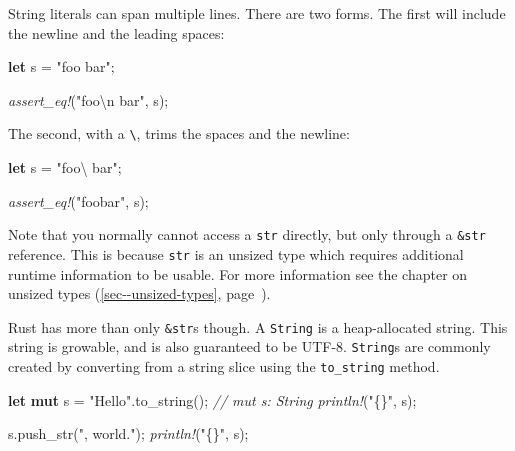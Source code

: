 \documentclass[a4paper,]{book}
\renewcommand*{\hyperlink}[2]{%
 #2 (\autoref{#1}, page~\pageref{#1})}
\newenvironment{Shaded}{\begin{snugshade}}{\end{snugshade}}
\newcommand{\KeywordTok}[1]{\textcolor[rgb]{0.13,0.29,0.53}{\textbf{{#1}}}}
\newcommand{\SpecialCharTok}[1]{\textcolor[rgb]{0.00,0.00,0.00}{{#1}}}
\newcommand{\StringTok}[1]{\textcolor[rgb]{0.31,0.60,0.02}{{#1}}}
\newcommand{\CommentTok}[1]{\textcolor[rgb]{0.56,0.35,0.01}{\textit{{#1}}}}
\newcommand{\PreprocessorTok}[1]{\textcolor[rgb]{0.56,0.35,0.01}{\textit{{#1}}}}
\newcommand{\NormalTok}[1]{{#1}}
\begin{document}
String literals can span multiple lines. There are two forms. The first
will include the newline and the leading spaces:

\begin{Shaded}
\begin{Highlighting}[]
\KeywordTok{let} \NormalTok{s = }\StringTok{"foo}
\StringTok{    bar"}\NormalTok{;}

\PreprocessorTok{assert_eq!}\NormalTok{(}\StringTok{"foo}\SpecialCharTok{\textbackslash{}n}\StringTok{    bar"}\NormalTok{, s);}
\end{Highlighting}
\end{Shaded}

The second, with a \texttt{\textbackslash{}}, trims the spaces and the
newline:

\begin{Shaded}
\begin{Highlighting}[]
\KeywordTok{let} \NormalTok{s = }\StringTok{"foo}\SpecialCharTok{\textbackslash{}}
\StringTok{    bar"}\NormalTok{;}

\PreprocessorTok{assert_eq!}\NormalTok{(}\StringTok{"foobar"}\NormalTok{, s);}
\end{Highlighting}
\end{Shaded}

Note that you normally cannot access a \texttt{str} directly, but only
through a \texttt{\&str} reference. This is because \texttt{str} is an
unsized type which requires additional runtime information to be usable.
For more information see the chapter on
\protect\hyperlink{sec--unsized-types}{unsized types}.

Rust has more than only \texttt{\&str}s though. A \texttt{String} is a
heap-allocated string. This string is growable, and is also guaranteed
to be UTF-8. \texttt{String}s are commonly created by converting from a
string slice using the \texttt{to\_string} method.

\begin{Shaded}
\begin{Highlighting}[]
\KeywordTok{let} \KeywordTok{mut} \NormalTok{s = }\StringTok{"Hello"}\NormalTok{.to_string(); }\CommentTok{// mut s: String}
\PreprocessorTok{println!}\NormalTok{(}\StringTok{"\{\}"}\NormalTok{, s);}

\NormalTok{s.push_str(}\StringTok{", world."}\NormalTok{);}
\PreprocessorTok{println!}\NormalTok{(}\StringTok{"\{\}"}\NormalTok{, s);}
\end{Highlighting}
\end{Shaded}
\end{document}
